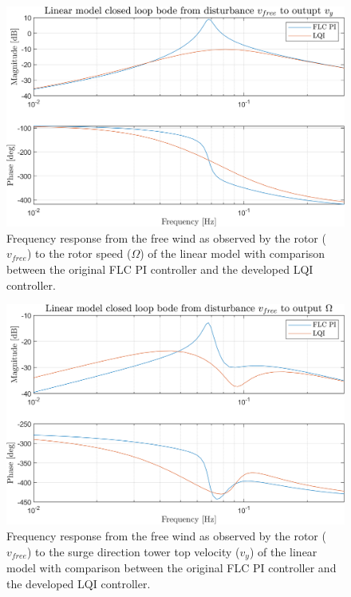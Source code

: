 \begin{figure}[ht]
	\centering
	\includegraphics[width=0.7\linewidth]{Graphics/TestResults/linearModPerf/10_vfreeTovy.png}
	\caption{Frequency response from the free wind as observed by the rotor ($ v_{free} $) to the rotor speed  ($ \Omega $) of the linear model with comparison between the original FLC PI controller and the developed LQI controller.}
	\label{fig:10_vfreeTovy}
\end{figure}

\begin{figure}[ht]
	\centering
	\includegraphics[width=0.7\linewidth]{Graphics/TestResults/linearModPerf/11_vfreeToW.png}
	\caption{Frequency response from the free wind as observed by the rotor ($ v_{free} $) to the surge direction tower top velocity ($ v_y $) of the linear model with comparison between the original FLC PI controller and the developed LQI controller.}
	\label{fig:11_vfreeToW}
\end{figure}

\clearpage
